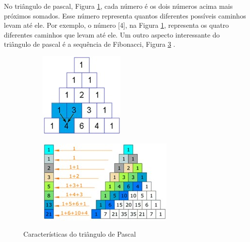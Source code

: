 No triângulo de pascal, Figura \ref{fig:pascal_triangle}, cada número é os dois números acima mais próximos somados. Esse número representa quantos diferentes possíveis caminhos levam até ele. Por exemplo, o número [4], na Figura \ref{fig:pascal_triangle}, representa os quatro diferentes caminhos que levam até ele. Um outro aspecto interessante do triângulo de pascal é a sequência de Fibonacci, Figura \ref{fig:pascal_triangle_fibonacci} \cite{mathisfun_pascal_triangle}.  

\begin{figure}[H]
\centering
	\begin{subfigure}[H]{0.47\linewidth}
	\centering
	\includegraphics[width=.55\linewidth]{sections/images/pascal_triangle.jpg}
	\caption{}
	\label{fig:pascal_triangle}
	\end{subfigure}
\hfill
	\begin{subfigure}[H]{0.47\linewidth}
	\centering
	\includegraphics[width=.9\linewidth]{sections/images/pascal_triangle_fibonacci.jpg}
	\caption{}
	\label{fig:pascal_triangle_fibonacci}
	\end{subfigure}%
\caption{Características do triângulo de Pascal}

\end{figure}
